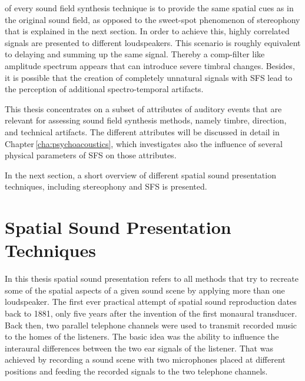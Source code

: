  of every sound field synthesis technique is
to provide the same spatial cues as in the original sound field, as opposed
to the sweet-spot
phenomenon of stereophony that is explained in the next section. In order to
achieve this, highly correlated signals are presented to
different loudspeakers. This scenario is roughly equivalent to delaying and
summing up the same signal. Thereby a comp-filter like amplitude spectrum
appears that can introduce severe timbral changes.
Besides, it is possible that the creation of completely unnatural
signals with \ac{SFS} lead to the perception of
additional spectro-temporal artifacts.

This thesis concentrates on a subset of attributes of auditory events that are
relevant for assessing sound field synthesis methods, namely timbre, direction,
and technical artifacts. The different attributes will be discussed in detail in
Chapter\,\ref{cha:psychoacoustics}, which investigates also the influence of
several physical parameters of \ac{SFS} on those attributes.

In the next section, a short overview of different spatial sound presentation
techniques, including stereophony and \ac{SFS} is presented.


\section{Spatial Sound Presentation Techniques}
\label{sec:spatial_sound_reproduction_and_synthesis_techniques}
%
In this thesis spatial sound presentation refers to all methods that try
to recreate some of the spatial aspects of a given sound scene by applying more
than one loudspeaker.
The first ever practical attempt of spatial sound reproduction dates back to
1881, only five years after the invention of the first monaural transducer.
Back then, two parallel telephone channels were used to transmit recorded
music to the homes of the listeners.\autocite{DuMoncel1881a}
The basic idea was the ability to influence the interaural
differences between the two ear signals of the listener. That was achieved by
recording a sound scene with two microphones placed at different positions 
and feeding the recorded signals to the two telephone channels.

